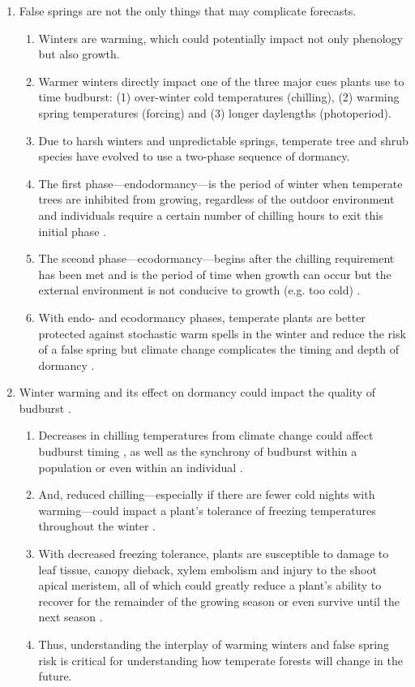 \documentclass{article}\usepackage[]{graphicx}\usepackage[]{color}
\begin{document}
\begin{enumerate}
\item False springs are not the only things that may complicate forecasts.
  \begin{enumerate}
  \item Winters are warming, which could potentially impact not only phenology but also growth.
  \item Warmer winters directly impact one of the three major cues plants use to time budburst: (1) over-winter cold temperatures (chilling), (2) warming spring temperatures (forcing) and (3) longer daylengths (photoperiod).
  \item Due to harsh winters and unpredictable springs, temperate tree and shrub species have evolved to use a two-phase sequence of dormancy.
  \item The first phase---endodormancy---is the period of winter when temperate trees are inhibited from growing, regardless of the outdoor environment and individuals require a certain number of chilling hours to exit this initial phase \citep{Charrier2011}.
  \item The sceond phase---ecodormancy---begins after the chilling requirement has been met and is the period of time when growth can occur but the external environment is not conducive to growth (e.g. too cold) \citep{Basler2012}. 
  \item With endo- and ecodormancy phases, temperate plants are better protected against stochastic warm spells in the winter and reduce the risk of a false spring \citep{Basler2014} but climate change complicates the timing and depth of dormancy \citep{Charrier2011}.
  \end{enumerate}

\item Winter warming and its effect on dormancy could impact the quality of budburst \citep{Cleland2007,Bonhomme2010}. 
  \begin{enumerate}
  \item Decreases in chilling temperatures from climate change could affect budburst timing \citep{Nanninga2017}, as well as the synchrony of budburst within a population or even within an individual \citep{Sanzperez2009}.
  \item And, reduced chilling---especially if there are fewer cold nights with warming---could impact a plant's tolerance of freezing temperatures throughout the winter \citep{Charrier2011}.
  \item With decreased freezing tolerance, plants are susceptible to damage to leaf tissue, canopy dieback, xylem embolism and injury to the shoot apical meristem, all of which could greatly reduce a plant's ability to recover for the remainder of the growing season or even survive until the next season \citep{Sakai1987,Gu2008}.
  \item Thus, understanding the interplay of warming winters and false spring risk is critical for understanding how temperate forests will change in the future. 
  \end{enumerate}
  

\end{enumerate}
\end{document}

